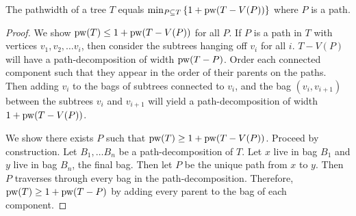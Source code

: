 \begin{proposition}
	The pathwidth of a tree \(T\) equals \(\min_{P \subseteq T} \left\lbrace 1 + \operatorname{pw}(T - V(P))\right\rbrace \) where \(P\) is a path.
\end{proposition}

\begin{proof}[Proof]
	We show \(\operatorname{pw}(T) \leq 1 + \operatorname{pw}(T - V(P))\) for all $P$. If \(P\) is a path in \(T\) with vertices \(v_1, v_2, \ldots v_i\), then consider the subtrees hanging off \(v_i\) for all \(i\). \(T - V(P)\) will have a path-decomposition of width $\operatorname{pw}(T - P)$. Order each connected component such that they appear in the order of their parents on the paths. Then adding \(v_i\) to the bags of subtrees connected to \(v_i\), and the bag \((v_i, v_{i+1})\) between the subtrees \(v_i\) and \(v_{i + 1}\) will yield a path-decomposition of width \(1 + \operatorname{pw}(T - V(P))\).

	We show there exists $P$ such that \(\operatorname{pw}(T) \geq 1 + \operatorname{pw}(T - V(P))\). Proceed by construction. Let \(B_1, \ldots B_n\) be a path-decomposition of \(T\). Let \(x\) live in bag \(B_1\) and \(y\) live in bag \(B_n\), the final bag. Then let \(P\) be the unique path from \(x\) to \(y\). Then \(P\) traverses through every bag in the path-decomposition. Therefore, \(\operatorname{pw}(T) \geq 1 + \operatorname{pw}(T - P)\) by adding every parent to the bag of each component. 
\end{proof}
